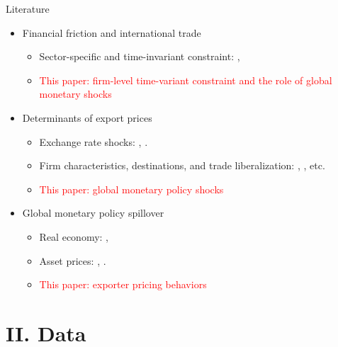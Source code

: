 \documentclass[10pt]{beamer}
\begin{document}
\begin{frame}{Literature}
\begin{itemize}
    \item Financial friction and international trade
    \begin{itemize}
        \item Sector-specific and time-invariant constraint: \cite{manova2013credit}, \cite{lin2018international}
        \item \textcolor{red}{This paper: firm-level time-variant constraint and the role of global monetary shocks}
    \end{itemize}
    \item Determinants of export prices
        \begin{itemize}
        \item Exchange rate shocks: \cite{amiti2014importers}, \cite{auer2018quality}.
        \item Firm characteristics, destinations, and trade liberalization: \cite{manova2012export}, \cite{fan2015trade}, etc.
        \item \textcolor{red}{This paper: global monetary policy shocks}
    \end{itemize}
    \item Global monetary policy spillover
        \begin{itemize}
        \item Real economy: \cite{bluedorn2011open}, \cite{di2023impact}
        \item Asset prices: \cite{rogers2014evaluating}, \cite{miranda2020us}.
        \item \textcolor{red}{This paper: exporter pricing behaviors}
    \end{itemize}
\end{itemize}

\end{frame}

\section{II. Data}
\end{document}
